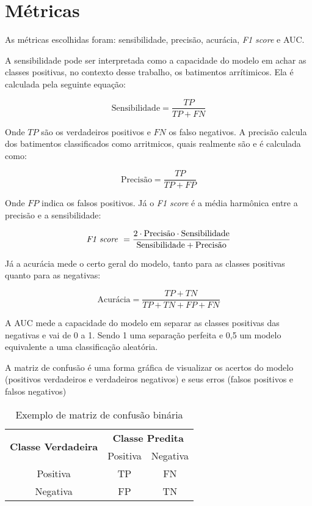 \documentclass[
    12pt,                %
    openright,           %
    oneside,             %
    a4paper,             %
    brazil               %
]{abntex2}
\begin{document}
\section{Métricas}

As métricas escolhidas foram: sensibilidade, precisão, acurácia, \textit{F1 score} e AUC. 

A sensibilidade pode ser interpretada como a capacidade do modelo em achar as classes positivas, no contexto desse trabalho, os batimentos arrítimicos. Ela é calculada pela seguinte equação:

\begin{equation}
\text{Sensibilidade} = \frac{TP}{TP + FN}
\end{equation}

Onde $TP$ são os verdadeiros positivos e $FN$ os falso negativos. A precisão calcula dos batimentos classificados como arritmicos, quais realmente são e é calculada como:

\begin{equation}
    \text{Precisão} = \frac{TP}{TP + FP}
\end{equation}

Onde $FP$ indica os falsos positivos. Já o \textit{F1 score} é a média harmônica entre a precisão e a sensibilidade:

\begin{equation}
  \text{\textit{F1 score} } = \frac{2 \cdot \text{Precisão}  \cdot  \text{Sensibilidade}}{\text{Sensibilidade} + \text{Precisão}}
\end{equation}

Já a acurácia mede o certo geral do modelo, tanto para as classes positivas quanto para as negativas:

\begin{equation}
\text{Acurácia} = \frac{TP + TN}{TP + TN + FP + FN}
\end{equation}

A AUC mede a capacidade do modelo em separar as classes positivas das negativas e vai de 0 a 1. Sendo 1 uma separação perfeita
e 0,5 um modelo equivalente a uma classificação aleatória.

A matriz de confusão é uma forma gráfica de visualizar os acertos do modelo (positivos verdadeiros e verdadeiros negativos) e seus erros (falsos positivos e falsos negativos)

\begin{table}[htb]
\centering
\caption{Exemplo de matriz de confusão binária}
\label{tab:matriz_confusao}
\begin{tabular}{|c|c|c|}
\hline
\multirow{2}{*}{\textbf{Classe Verdadeira}} & \multicolumn{2}{c|}{\textbf{Classe Predita}} \\ \cline{2-3} 
 & Positiva & Negativa \\ \hline
Positiva & TP & FN \\ \hline
Negativa & FP & TN \\ \hline
\end{tabular}
\end{table}
\end{document}
